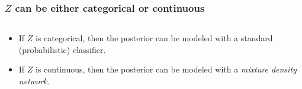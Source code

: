 \documentclass{beamer}
\begin{document}
\begin{frame}
    \frametitle{$Z$ can be either categorical or continuous}

    \begin{columns}
        \begin{column}{0.6\textwidth}
            \begin{itemize}
                \item If $Z$ is {\color{blue} categorical}, then the posterior can be modeled with a standard (probabilistic) classifier.

                \vspace{1cm}

                \item If $Z$ is {\color{red} continuous}, then the posterior can be modeled with a {\it mixture density network}.

                \vspace{1cm}


\end{itemize}
\end{column}
\end{columns}
\end{frame}
\end{document}
